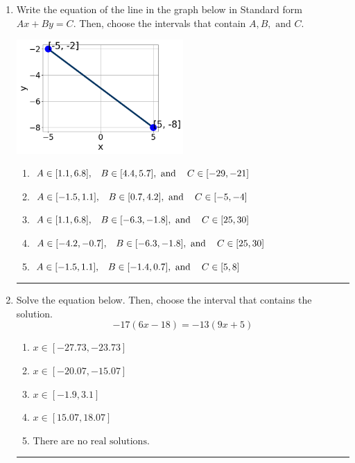 \documentclass[14pt]{extbook}
\newcommand{\litem}[1]{\item#1\hspace*{-1cm}\rule{\textwidth}{0.4pt}}
\begin{document}
\begin{enumerate}
\litem{
Write the equation of the line in the graph below in Standard form $Ax+By=C$. Then, choose the intervals that contain $A, B, \text{ and } C$.
\begin{center}
    \includegraphics[width=0.5\textwidth]{../Figures/linearGraphToStandardA.png}
\end{center}
\begin{enumerate}[label=\Alph*.]
\item \( A \in [1.1, 6.8], \hspace{3mm} B \in [4.4, 5.7], \text{ and } \hspace{3mm} C \in [-29, -21] \)
\item \( A \in [-1.5, 1.1], \hspace{3mm} B \in [0.7, 4.2], \text{ and } \hspace{3mm} C \in [-5, -4] \)
\item \( A \in [1.1, 6.8], \hspace{3mm} B \in [-6.3, -1.8], \text{ and } \hspace{3mm} C \in [25, 30] \)
\item \( A \in [-4.2, -0.7], \hspace{3mm} B \in [-6.3, -1.8], \text{ and } \hspace{3mm} C \in [25, 30] \)
\item \( A \in [-1.5, 1.1], \hspace{3mm} B \in [-1.4, 0.7], \text{ and } \hspace{3mm} C \in [5, 8] \)

\end{enumerate} }
\litem{
Solve the equation below. Then, choose the interval that contains the solution.\[ -17(6x -18) = -13(9x + 5) \]\begin{enumerate}[label=\Alph*.]
\item \( x \in [-27.73, -23.73] \)
\item \( x \in [-20.07, -15.07] \)
\item \( x \in [-1.9, 3.1] \)
\item \( x \in [15.07, 18.07] \)
\item \( \text{There are no real solutions.} \)


\end{enumerate}}
\end{enumerate}
\end{document}

